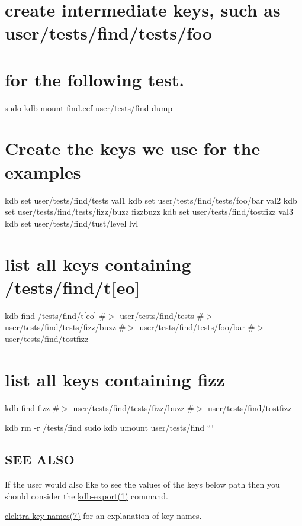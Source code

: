 \section*{create intermediate keys, such as {\ttfamily user/tests/find/tests/foo}}

\section*{for the following test.}

sudo kdb mount find.\+ecf user/tests/find dump

\section*{Create the keys we use for the examples}

kdb set user/tests/find/tests val1 kdb set user/tests/find/tests/foo/bar val2 kdb set user/tests/find/tests/fizz/buzz fizzbuzz kdb set user/tests/find/tostfizz val3 kdb set user/tests/find/tust/level lvl

\section*{list all keys containing /tests/find/t\mbox{[}eo\mbox{]}}

kdb find \textquotesingle{}/tests/find/t\mbox{[}eo\mbox{]}\textquotesingle{} \#$>$ user/tests/find/tests \#$>$ user/tests/find/tests/fizz/buzz \#$>$ user/tests/find/tests/foo/bar \#$>$ user/tests/find/tostfizz

\section*{list all keys containing fizz}

kdb find \textquotesingle{}fizz\textquotesingle{} \#$>$ user/tests/find/tests/fizz/buzz \#$>$ user/tests/find/tostfizz

kdb rm -\/r /tests/find sudo kdb umount user/tests/find ```

\subsection*{S\+EE A\+L\+SO}


\begin{DoxyItemize}
\item If the user would also like to see the values of the keys below {\ttfamily path} then you should consider the \hyperlink{doc_help_kdb-export_md}{kdb-\/export(1)} command.
\item \hyperlink{doc_help_elektra-key-names_md}{elektra-\/key-\/names(7)} for an explanation of key names. 
\end{DoxyItemize}